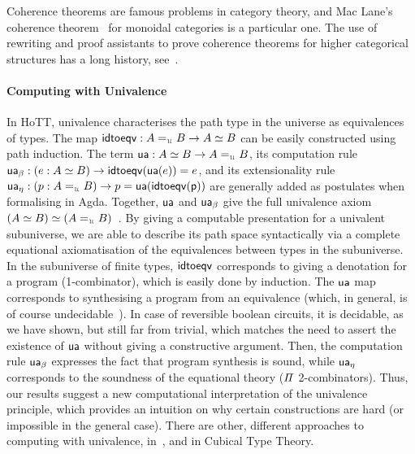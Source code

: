 Coherence theorems are famous problems in category theory, and Mac Lane's coherence
theorem~\cite{maclaneNaturalAssociativityCommutativity1963,joyalBraidedTensorCategories1993,gurskiInfiniteLoopSpaces2013}
for monoidal categories is a particular one. The use of rewriting and proof assistants to prove coherence theorems
for higher categorical structures has a long history, see~\cite*{forestCoherenceGrayCategories2018,beylinExtractingProofCoherence1996}.

\paragraph{Computing with Univalence} In HoTT, univalence characterises the path type in the universe as equivalences of
types. The map $\term{idtoeqv} : A \id_{\UU} B \to A \eqv B$ can be easily constructed using path induction. The term
$\term{ua} : A \eqv B \to A \id_{\UU} B$, its computation rule
$\term{ua_\beta} : (e : A \eqv B) \to \term{idtoeqv}(\term{ua}(e)) \id e$, and its extensionality rule
$\term{ua_\eta} : (p : A \id_{\UU} B) \to p \id \term{ua}(\term{idtoeqv(p)})$ are generally added as postulates when
formalising in Agda. Together, $\operatorname{\mathsf{ua}}$ and $\operatorname{\mathsf{ua}}_\beta$ give the full univalence axiom
$(A \eqv B) \eqv (A \id_{\UU} B)$~\cite[Theorem 3.5]{ortonDecomposingUnivalenceAxiom2018}.
By giving a computable presentation for a univalent subuniverse, we are able to describe its path space syntactically
via a complete equational axiomatisation of the equivalences between types in the subuniverse.
In the subuniverse of finite types, $\operatorname{\mathsf{idtoeqv}}$ corresponds to giving a denotation for a program (1-combinator),
which is easily done by induction. The $\operatorname{\mathsf{ua}}$ map corresponds to synthesising a program from an equivalence (which,
in general, is of course undecidable~\cite{krogmeierDecidableSynthesisPrograms2020}). In case of reversible boolean
circuits, it is decidable, as we have shown, but still far from trivial, which matches the need to assert the existence
of $\operatorname{\mathsf{ua}}$ without giving a constructive argument. Then, the computation rule $\operatorname{\mathsf{ua_\beta}}$ expresses the fact
that program synthesis is sound, while $\operatorname{\mathsf{ua_\eta}}$ corresponds to the soundness of the equational theory ($\mathit{\Pi}$
2-combinators). Thus, our results suggest a new computational interpretation of the univalence principle, which
provides an intuition on why certain constructions are hard (or impossible in the general case). There are other,
different approaches to computing with univalence,
in~\cite*{angiuliInternalizingRepresentationIndependence2021,tabareauMarriageUnivalenceParametricity2021}, and in
Cubical Type
Theory\cite*{angiuliComputationalSemanticsCartesianCubical2019,vezzosiCubicalAgdaDependently2019}.


